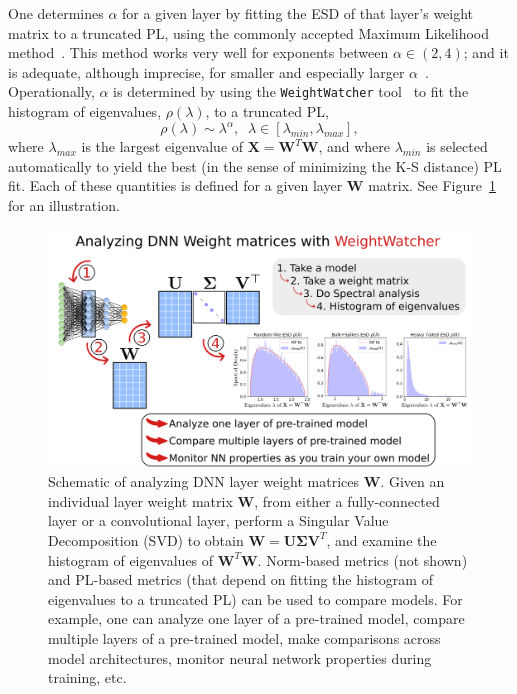 One determines $\alpha$ for a given layer by fitting the ESD of that layer's weight matrix to a truncated PL, using the commonly accepted Maximum Likelihood method~\cite{CSN09_powerlaw,ABP14}.
This method works very well for exponents between $\alpha\in(2,4)$; and it is adequate, although imprecise, for smaller and especially larger $\alpha$~\cite{newman2005_zipf}. 
%
Operationally, $\alpha$ is determined by using the \texttt{WeightWatcher} tool~\cite{weightwatcher_package} to fit the histogram of eigenvalues, $\rho(\lambda)$, to a truncated PL, 
\begin{equation}
\rho(\lambda)\sim\lambda^{\alpha},\;\;\lambda\in[\lambda_{min},\lambda_{max}] ,
\end{equation}
where $\lambda_{max}$ is the largest eigenvalue of $\mathbf{X}=\mathbf{W}^{T}\mathbf{W}$, and 
where $\lambda_{min}$ is selected automatically to yield the best (in the sense of minimizing the K-S distance) PL fit.
Each of these quantities is defined for a given layer $\mathbf{W}$ matrix.
See Figure~\ref{fig:ww} for an illustration.

\begin{figure}[t]
    \centering
    \includegraphics[width=15.0cm]{img/WeightWatcher_v2}
    \caption{Schematic of analyzing DNN layer weight matrices $\mathbf{W}$.  
             Given an individual layer weight matrix $\mathbf{W}$, from either a fully-connected layer or a convolutional layer, perform a Singular Value Decomposition (SVD) to obtain $\mathbf{W} = \mathbf{U} \mathbf{\Sigma} \mathbf{V}^{T}$, and examine the histogram of eigenvalues of $\mathbf{W}^{T}\mathbf{W}$.
             Norm-based metrics (not shown) and PL-based metrics (that depend on fitting the histogram of eigenvalues to a truncated PL) can be used to compare models.
             For example, one can analyze one layer of a pre-trained model, compare multiple layers of a pre-trained model, make comparisons across model architectures, monitor neural network properties during training, etc. 
}
    \label{fig:ww}
\end{figure}



